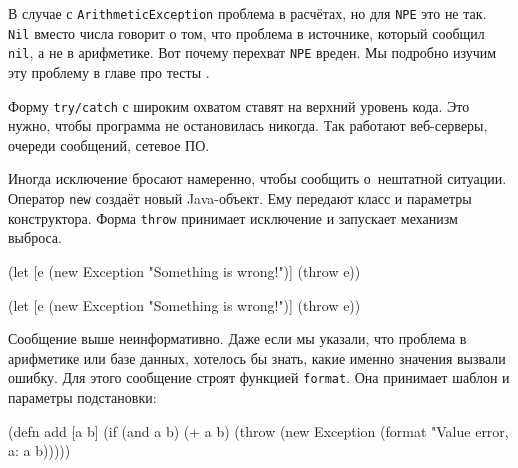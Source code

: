 В случае с \verb|ArithmeticException| проблема в расчётах, но для \verb|NPE|
это не так. \verb|Nil| вместо числа говорит о том, что проблема в источнике,
который сообщил \verb|nil|, а не в арифметике. Вот почему перехват
\verb|NPE| вреден. Мы подробно изучим эту проблему в главе про
тесты .

Форму \verb|try/catch| с широким охватом ставят на верхний уровень кода. Это
нужно, чтобы программа не остановилась никогда. Так работают веб-серверы,
очереди сообщений, сетевое ПО.


Иногда исключение бросают намеренно, чтобы сообщить о~нештатной
ситуации. Оператор \verb|new| создаёт новый Java-объект. Ему передают класс и
параметры конструктора. Форма \verb|throw| принимает исключение и запускает
механизм выброса.

\ifx\DEVICETYPE\MOBILE

\begin{english}
  \begin{clojure}
(let [e (new Exception
          "Something is wrong!")]
  (throw e))
  \end{clojure}
\end{english}

\else

\begin{english}
  \begin{clojure}
(let [e (new Exception "Something is wrong!")]
  (throw e))
  \end{clojure}
\end{english}

\fi

Сообщение выше неинформативно. Даже если мы указали, что проблема в арифметике
или базе данных, хотелось бы знать, какие именно значения вызвали ошибку. Для
этого сообщение строят функцией \verb|format|. Она принимает шаблон и
параметры подстановки:


\ifx\DEVICETYPE\MOBILE

\begin{english}
  \begin{clojure}
(defn add [a b]
  (if (and a b)
    (+ a b)
    (throw
      (new Exception
        (format
          "Value error, a: %
          a b)))))
  \end{clojure}
\end{english}

\else

